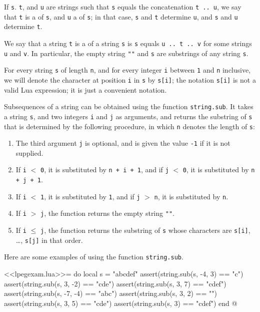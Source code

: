 \documentclass{article}
\begin{document}
If \verb|s|. \verb|t|, and \verb|u| are strings such that \verb|s|
equals the concatenation \verb|t .. u|, we say that \verb|t| is a
 of \texttt{s}, and \verb|u| a  of
\verb|s|; in that case, \verb|s| and \verb|t| determine \verb|u|, and
\verb|s| and \verb|u| determine \verb|t|.

We say that a string \verb|t| is a  of a string
\verb|s| is \verb|s| equals \verb|u .. t .. v| for some strings
\verb|u| and \verb|v|.  In particular, the empty string \verb|""| and
\verb|s| are substrings of any string \verb|s|.

For every string \verb|s| of length \verb|n|, and for every integer
\verb|i| between \verb|1| and \verb|n| inclusive, we will denote the
character at position \verb|i| in \verb|s| by \verb||\verb|s[i]|; the
notation \verb|s[i]| is not a valid Lua expression; it is just a
convenient notation.

Subsequences of a string can be obtained using the function
\verb|string.sub|.  It takes a string \verb|s|, and two integers
\verb|i| and \verb|j| as arguments, and returns the substring of
\verb|s| that is determined by the following procedure, in which
\verb|n| denotes the length of \verb|s|:
\begin{enumerate}
\item The third argument \verb|j| is optional, and is given the value
  \verb|-1| if it is not supplied.
\item If \verb|i| \(<\) \verb|0|, it is substituted by
  \verb|n + i + 1|, and if \verb|j| \(<\) \verb|0|, it is substituted
  by \verb|n + j + 1|.
\item If \verb|i| \(<\) \verb|1|, it is substituted by \verb|1|, and
  if \verb|j| \(>\) \verb|n|, it is substituted by \verb|n|.
\item If \verb|i| \(>\) \verb|j|, the function returns the empty
  string \verb|""|.
\item If \verb|i| \(\leq\) \verb|j|, the function returns the
  substring of \verb|s| whose characters are \verb|s[i]|, \dots,
  \verb|s[j]| in that order.
\end{enumerate}

Here are some examples of using the function \verb|string.sub|.
\begin{codechunk}
<<lpegexam.lua>>=
do
  local s = "abcdef"
  assert(string.sub(s, -4, 3) == "c")
  assert(string.sub(s, 3, -2) == "cde")
  assert(string.sub(s, 3, 7) == "cdef")
  assert(string.sub(s, -7, -4) == "abc")
  assert(string.sub(s, 3, 2) == "")
  assert(string.sub(s, 3, 5) == "cde")
  assert(string.sub(s, 3) == "cdef")
end
@
\end{codechunk}
\end{document}
